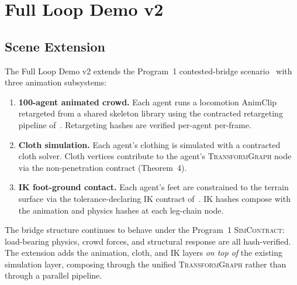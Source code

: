\documentclass[sigconf,nonacm]{acmart}
\newcommand{\transformgraph}{\textsc{TransformGraph}}
\newcommand{\simcontract}{\textsc{SimContract}}
\begin{document}
\section{Full Loop Demo v2}
\label{sec:demo}

\subsection{Scene Extension}
The Full Loop Demo v2 extends the Program~1 contested-bridge
scenario~\cite{trustbyconstruction2026} with three animation
subsystems:

\begin{enumerate}
  \item \textbf{100-agent animated crowd.} Each agent runs a
    locomotion AnimClip retargeted from a shared skeleton
    library using the contracted retargeting pipeline
    of~\cite{paper-6-anim-sca2027}. Retargeting hashes are
    verified per-agent per-frame.
  \item \textbf{Cloth simulation.} Each agent's clothing is
    simulated with a contracted cloth solver. Cloth vertices
    contribute to the agent's \transformgraph{} node via the
    non-penetration contract (Theorem~4).
  \item \textbf{IK foot-ground contact.} Each agent's feet are
    constrained to the terrain surface via the tolerance-declaring
    IK contract of~\cite{paper-7-ik-siggraph2027}. IK hashes
    compose with the animation and physics hashes at each
    leg-chain node.
\end{enumerate}

The bridge structure continues to behave under the Program~1
\simcontract{}: load-bearing physics, crowd forces, and
structural response are all hash-verified. The extension adds
the animation, cloth, and IK layers \emph{on top of} the
existing simulation layer, composing through the unified
\transformgraph{} rather than through a parallel pipeline.
\end{document}
